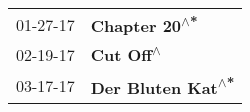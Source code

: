\begin{supertabular}{p{0.25\columnwidth}p{0.75\columnwidth}}
 01-27-17 &      \textbf{Chapter 20\textsuperscript{$\wedge$*}} \\
 02-19-17 &          \textbf{Cut Off\textsuperscript{$\wedge$}} \\
 03-17-17 &  \textbf{Der Bluten Kat\textsuperscript{$\wedge$*}} \\
\end{supertabular}

